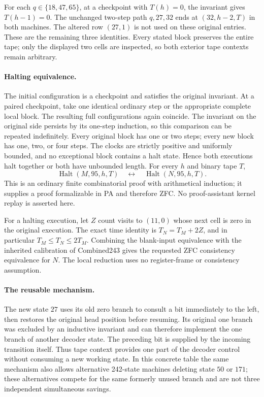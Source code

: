 For each $q\in\{18,47,65\}$, at a checkpoint with $T(h)=0$, the
invariant gives $T(h-1)=0$. The unchanged two-step path $q,27,32$
ends at $(32,h-2,T)$ in both machines. The altered row $(27,1)$ is not
used on these original entries. These are the remaining three identities.
Every stated block preserves the entire tape; only the displayed two
cells are inspected, so both exterior tape contexts remain arbitrary.

\paragraph{Halting equivalence.}
The initial configuration is a checkpoint and satisfies the original
invariant. At a paired checkpoint, take one identical ordinary step or
the appropriate complete local block. The resulting full configurations
again coincide. The invariant on the original side persists by its
one-step induction, so this comparison can be repeated indefinitely.
Every original block has one or two steps; every new block has one, two,
or four steps. The clocks are strictly positive and uniformly bounded,
and no exceptional block contains a halt state. Hence both executions
halt together or both have unbounded length. For every $h$ and binary
tape $T$,
\[
\operatorname{Halt}(M,95,h,T)
\quad\longleftrightarrow\quad
\operatorname{Halt}(N,95,h,T).
\]
This is an ordinary finite combinatorial proof with arithmetical
induction; it supplies a proof formalizable in PA and therefore ZFC.
No proof-assistant kernel replay is asserted here.

For a halting execution, let $Z$ count visits to $(11,0)$ whose next
cell is zero in the original execution. The exact time identity is
$T_N=T_M+2Z$, and in particular $T_M\leq T_N\leq2T_M$.
Combining the blank-input equivalence with the inherited calibration
of Combined243 gives the requested ZFC consistency equivalence for $N$.
The local reduction uses no register-frame or consistency assumption.

\paragraph{The reusable mechanism.}
The new state $27$ uses its old zero branch to consult a bit immediately
to the left, then restores the original head position before resuming.
Its original one branch was excluded by an inductive invariant and can
therefore implement the one branch of another decoder state. The
preceding bit is supplied by the incoming transition itself. Thus tape
context provides one part of the decoder control without consuming a
new working state. In this concrete table the same mechanism also
allows alternative 242-state machines deleting state $50$ or $171$;
these alternatives compete for the same formerly unused branch and
are not three independent simultaneous savings.
